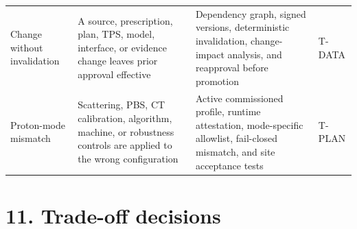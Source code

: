 \documentclass[11pt,letterpaper]{article}
\begin{document}
\begin{scriptsize}
\begin{longtable}{@{}L{0.16\textwidth}L{0.28\textwidth}L{0.38\textwidth}L{0.10\textwidth}@{}}
\addlinespace[2pt]
Change without invalidation & A source, prescription, plan, TPS, model, interface, or evidence change leaves prior approval effective & Dependency graph, signed versions, deterministic invalidation, change-impact analysis, and reapproval before promotion & T-DATA \\
\addlinespace[2pt]
Proton-mode mismatch & Scattering, PBS, CT calibration, algorithm, machine, or robustness controls are applied to the wrong configuration & Active commissioned profile, runtime attestation, mode-specific allowlist, fail-closed mismatch, and site acceptance tests & T-PLAN \\
\end{longtable}
\end{scriptsize}

\section{11. Trade-off decisions}
\end{document}
